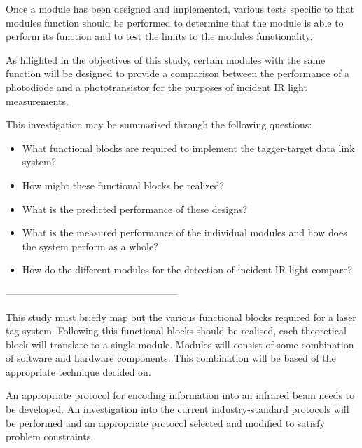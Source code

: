 Once a module has been designed and implemented, various tests specific to that modules function should be performed to determine that the module is able to perform its function and to test the limits to the modules functionality.

As hilighted in the objectives of this study, certain modules with the same function will be designed to provide a comparison between the performance of a photodiode and a phototransistor for the purposes of incident IR light measurements.

This investigation may be summarised through the following questions:

\begin{itemize}
	\item What functional blocks are required to implement the tagger-target data link system?
	\item How might these functional blocks be realized?
	\item What is the predicted performance of these designs?
	\item What is the measured performance of the individual modules and how does the system perform as a whole?
	\item How do the different modules for the detection of incident IR light compare?
%	
\end{itemize}


\iffalse

-----------------------------------------------------

This study must briefly map out the various functional blocks required for a laser tag system. Following this functional blocks should be realised, each theoretical block will translate to a single module. Modules will consist of some combination of software and hardware components. This combination will be based of the appropriate technique decided on.

An appropriate protocol for encoding information into an infrared beam needs to be developed. An investigation into the current industry-standard protocols will be performed and an appropriate protocol selected and modified to satisfy problem constraints.

